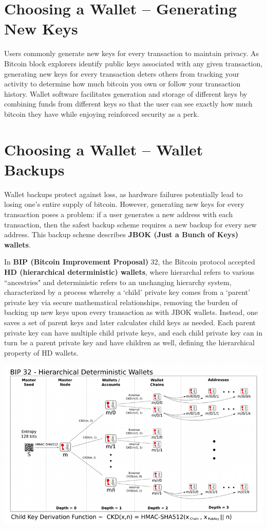 \documentclass[full.tex]{subfiles}
\begin{document}
    \section*{Choosing a Wallet -- Generating New Keys}
    
    Users commonly generate new keys for every transaction to maintain privacy. As Bitcoin block explorers identify public keys associated with any given transaction, generating new keys for every transaction deters others from tracking your activity to determine how much bitcoin you own or follow your transaction history. Wallet software facilitates generation and storage of different keys by combining funds from different keys so that the user can see exactly how much bitcoin they have while enjoying reinforced security as a perk.
    
    \section*{Choosing a Wallet -- Wallet Backups}
    
    Wallet backups protect against loss, as hardware failures potentially lead to losing one's entire supply of bitcoin. However, generating new keys for every transaction poses a problem: if a user generates a new address with each transaction, then the safest backup scheme requires a new backup for every new address. This backup scheme describes \textbf{JBOK (Just a Bunch of Keys) wallets}.
    
    In \textbf{BIP (Bitcoin Improvement Proposal)} 32, the Bitcoin protocol accepted \textbf{HD (hierarchical deterministic) wallets}, where hierarchal refers to various ``ancestries" and deterministic refers to an unchanging hierarchy system, characterized by a process whereby a `child' private key comes from a `parent' private key via secure mathematical relationships, removing the burden of backing up new keys upon every transaction as with JBOK wallets. Instead, one saves a set of parent keys and later calculates child keys as needed. Each parent private key can have multiple child private keys, and each child private key can in turn be a parent private key and have children as well, defining the hierarchical property of HD wallets.  

   \includegraphics[scale=3.5]{bip32}
   
\end{document}

